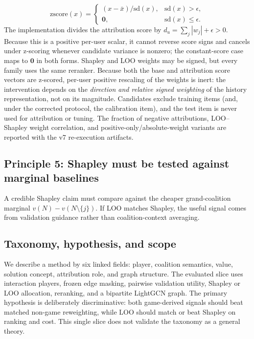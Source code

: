 \documentclass[pdflatex,sn-mathphys-num]{sn-jnl}
\begin{document}
\[
\mathrm{zscore}(x)=\begin{cases}(x-\bar{x})/\mathrm{sd}(x),&\mathrm{sd}(x)>\epsilon,\\ \mathbf{0},&\mathrm{sd}(x)\le\epsilon.\end{cases}
\]
The implementation divides the attribution score by $d_u=\sum_j|w_j|+\epsilon>0$. Because this is a positive per-user scalar, it cannot reverse score signs and cancels under z-scoring whenever candidate variance is nonzero; the constant-score case maps to $\mathbf{0}$ in both forms. Shapley and LOO weights may be signed, but every family uses the same reranker. Because both the base and attribution score vectors are z-scored, per-user positive rescaling of the weights is inert: the intervention depends on the \emph{direction and relative signed weighting} of the history representation, not on its magnitude. Candidates exclude training items (and, under the corrected protocol, the calibration item), and the test item is never used for attribution or tuning. The fraction of negative attributions, LOO--Shapley weight correlation, and positive-only/absolute-weight variants are reported with the v7 re-execution artifacts.

\subsection{Principle 5: Shapley must be tested against marginal baselines}\label{subsec:principle_loo}

A credible Shapley claim must compare against the cheaper grand-coalition marginal $v(N)-v(N\setminus\{j\})$. If LOO matches Shapley, the useful signal comes from validation guidance rather than coalition-context averaging.

\subsection{Taxonomy, hypothesis, and scope}\label{sec:taxonomy}\label{sec:detailed_taxonomy}\label{sec:review_method}
We describe a method by six linked fields: player, coalition semantics, value, solution concept, attribution role, and graph structure. The evaluated slice uses interaction players, frozen edge masking, pairwise validation utility, Shapley or LOO allocation, reranking, and a bipartite LightGCN graph. The primary hypothesis is deliberately discriminative: both game-derived signals should beat matched non-game reweighting, while LOO should match or beat Shapley on ranking and cost. This single slice does not validate the taxonomy as a general theory.
\end{document}
